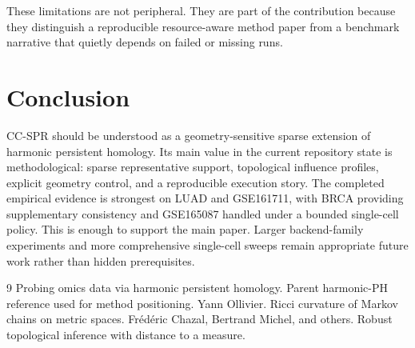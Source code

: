 \documentclass[11pt]{article}
\begin{document}
These limitations are not peripheral. They are part of the contribution because they distinguish a reproducible resource-aware method paper from a benchmark narrative that quietly depends on failed or missing runs.

\section{Conclusion}
CC-SPR should be understood as a geometry-sensitive sparse extension of harmonic persistent homology. Its main value in the current repository state is methodological: sparse representative support, topological influence profiles, explicit geometry control, and a reproducible execution story. The completed empirical evidence is strongest on LUAD and GSE161711, with BRCA providing supplementary consistency and GSE165087 handled under a bounded single-cell policy. This is enough to support the main paper. Larger backend-family experiments and more comprehensive single-cell sweeps remain appropriate future work rather than hidden prerequisites.


\begin{thebibliography}{9}
Probing omics data via harmonic persistent homology. Parent harmonic-PH reference used for method positioning.
Yann Ollivier. Ricci curvature of Markov chains on metric spaces.
Fr\'ed\'eric Chazal, Bertrand Michel, and others. Robust topological inference with distance to a measure.
\end{thebibliography}
\end{document}
